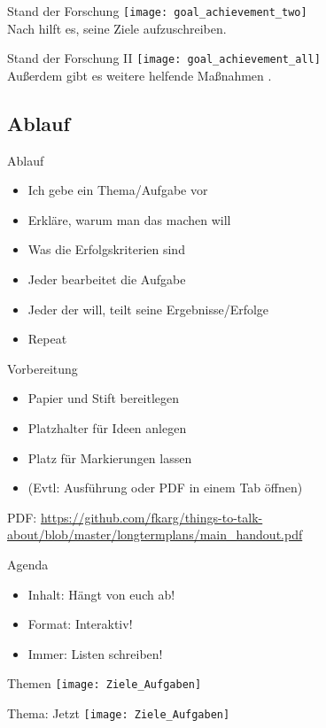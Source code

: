 \begin{frame}[c]{Stand der Forschung}
    \texttt{[image: goal\_achievement\_two]} \\
    Nach \cite{better-goals-2} hilft es, seine Ziele aufzuschreiben.
\end{frame}

\begin{frame}[c]{Stand der Forschung II}
    \texttt{[image: goal\_achievement\_all]} \\
    Außerdem gibt es weitere helfende Maßnahmen \cite{better-goals-2}.
\end{frame}



\subsection{Ablauf}


\begin{frame}[c]{Ablauf}
    \begin{itemize}[<+(1)->]
        \item Ich gebe ein Thema/Aufgabe vor
        \item Erkläre, warum man das machen will
        \item Was die Erfolgskriterien sind
        \item Jeder bearbeitet die Aufgabe
        \item Jeder der will, teilt seine Ergebnisse/Erfolge
        \item Repeat
    \end{itemize}
\end{frame}


\begin{frame}[c]{Vorbereitung}
    \begin{itemize}[<+(1)->]
        \item Papier und Stift bereitlegen
        \item Platzhalter für Ideen anlegen
        \item Platz für Markierungen lassen
        \item (Evtl: Ausführung \cite{longtermplans-post} oder PDF \cite{longtermplans-pdf} in einem Tab öffnen)
    \end{itemize}
    \pause
    PDF: \url{https://github.com/fkarg/things-to-talk-about/blob/master/longtermplans/main_handout.pdf}
\end{frame}


\begin{frame}[c]{Agenda}
    \Large
    \begin{itemize}[<+(1)->]
        \item Inhalt: Hängt von euch ab!
        \item Format: Interaktiv!
        \item Immer: Listen schreiben!
    \end{itemize}
\end{frame}


\begin{frame}[c]{Themen}
    \texttt{[image: Ziele\_Aufgaben]}
\end{frame}


\begin{frame}[c]{Thema: Jetzt}
    \texttt{[image: Ziele\_Aufgaben]}
\end{frame}
